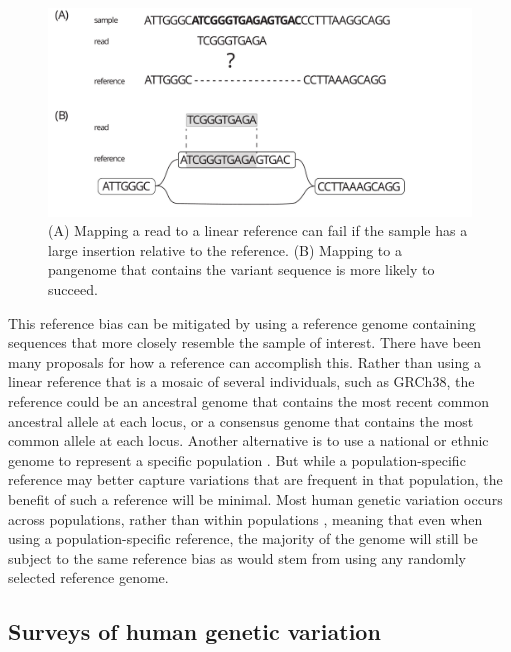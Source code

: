 \documentclass[11pt]{ucscthesis}
\begin{document}
\begin{figure}
    \centering
    \includegraphics[width=\columnwidth]{mapping_example.pdf}
    \caption{(A) Mapping a read to a linear reference can fail if the sample has a large insertion relative to the reference. (B) Mapping to a pangenome that contains the variant sequence is more likely to succeed.}
    \label{fig:mapping_example}
\end{figure}



This reference bias can be mitigated by using a reference genome containing sequences that more closely resemble the sample of interest.
There have been many proposals for how a reference can accomplish this.
Rather than using a linear reference that is a mosaic of several individuals, such as GRCh38, the reference could be an ancestral genome that contains the most recent common ancestral allele at each locus, or a consensus genome that contains the most common allele at each locus.
Another alternative is to use a national or ethnic genome to represent a specific population \cite{ballouz_is_2019,chinese_national_genome_2023,korean_national_genome_2016,vietnamese_national_genome_2015,danish_national_genome_2015,swedish_national_genome_2018,kowal_race_2019}.
But while a population-specific reference may better capture variations that are frequent in that population, the benefit of such a reference will be minimal.
Most human genetic variation occurs across populations, rather than within populations \cite{nih_understanding_2007}, meaning that even when using a population-specific reference, the majority of the genome will still be subject to the same reference bias as would stem from using any randomly selected reference genome. 


\subsection{Surveys of human genetic variation}
\end{document}
